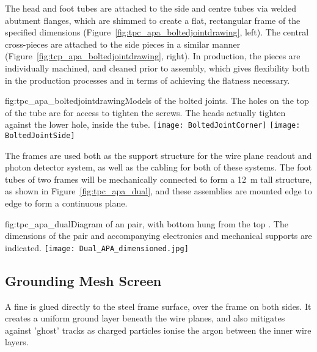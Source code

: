 The head and foot tubes are attached to the side and centre tubes via welded abutment flanges, which are shimmed to create a flat, rectangular frame of the specified dimensions (Figure~\ref{fig:tpc_apa_boltedjointdrawing}, left).  The central cross-pieces are attached to the side pieces in a similar manner (Figure~\ref{fig:tcp_apa_boltedjointdrawing}, right).  In production, the pieces are individually machined, and cleaned prior to assembly, which gives flexibility both in the production processes and in terms of achieving the flatness necessary.  

\begin{dunefigure}{fig:tpc_apa_boltedjointdrawing}{Models of the bolted joints. The holes on the top of the tube are for access to tighten the screws. The heads actually tighten against the lower hole, inside the tube.}
\texttt{[image: BoltedJointCorner]} 
\texttt{[image: BoltedJointSide]} 
\end{dunefigure}

The   frames are used both as the support structure for the wire plane readout and photon detector system, as well as the cabling for both of these systems. The foot tubes of two   frames will be mechanically connected to form a 12~m tall structure, as shown in Figure~\ref{fig:tpc_apa_dual}, and these assemblies are mounted edge to edge to form a continuous plane. 

\begin{dunefigure}{fig:tpc_apa_dual}{Diagram of an   pair,
    with bottom   hung from the top  . The dimensions of the   pair and
    accompanying electronics and mechanical supports are indicated.}
\texttt{[image: Dual\_APA\_dimensioned.jpg]} 
\end{dunefigure}


\subsection{Grounding Mesh Screen}
\label{sec:fdsp-apa-mesh}

A fine  is glued directly to the steel frame surface, over the frame on both sides.  It creates a uniform ground layer beneath the wire planes, and also mitigates against 'ghost' tracks as charged particles ionise the argon between the inner wire layers.

